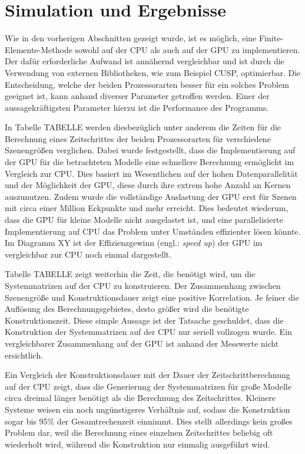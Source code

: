 \documentclass{article}
\begin{document}
  \section{Simulation und Ergebnisse} %
  \label{sec:simulation_und_ergebnisse}

    Wie in den vorherigen Abschnitten gezeigt wurde, ist es möglich, eine Finite-Elemente-Methode sowohl auf der CPU als auch auf der GPU zu implementieren.
    Der dafür erforderliche Aufwand ist annähernd vergleichbar und ist durch die Verwendung von externen Bibliotheken, wie zum Beispiel CUSP, optimierbar.
    Die Entscheidung, welche der beiden Prozessorarten besser für ein solches Problem geeignet ist, kann anhand diverser Parameter getroffen werden.
    Einer der aussagekräftigsten Parameter hierzu ist die Performance des Programms.

    In Tabelle TABELLE werden diesbezüglich unter anderem die Zeiten für die Berechnung eines Zeitschrittes der beiden Prozessorarten für verschiedene Szenengrößen verglichen.
    Dabei wurde festgestellt, dass die Implementierung auf der GPU für die betrachteten Modelle eine schnellere Berechnung ermöglicht im Vergleich zur CPU.
    Dies basiert im Wesentlichen auf der hohen Datenparallelität und der Möglichkeit der GPU, diese durch ihre extrem hohe Anzahl an Kernen auszunutzen.
    Zudem wurde die vollständige Auslastung der GPU erst für Szenen mit circa einer Million Eckpunkte und mehr erreicht.
    Dies bedeutet wiederum, dass die GPU für kleine Modelle nicht ausgelastet ist, und eine parallelisierte Implementierung auf CPU das Problem unter Umständen effizienter lösen könnte.
    Im Diagramm XY ist der Effizienzgewinn (engl.: \textit{speed up}) der GPU im vergleichbar zur CPU noch einmal dargestellt.

    Tabelle TABELLE zeigt weiterhin die Zeit, die benötigt wird, um die Systemmatrizen auf der CPU zu konstruieren.
    Der Zusammenhang zwischen Szenengröße und Konstruktionsdauer zeigt eine positive Korrelation.
    Je feiner die Auflösung des Berechnungsgebietes, desto größer wird die benötigte Konstruktionszeit.
    Diese simple Aussage ist der Tatsache geschuldet, dass die Konstruktion der Systemmatrizen auf der CPU nur seriell vollzogen wurde.
    Ein vergleichbarer Zusammenhang auf der GPU ist anhand der Messwerte nicht ersichtlich.

    Ein Vergleich der Konstruktionsdauer mit der Dauer der Zeitschrittberechnung auf der CPU zeigt, dass die Generierung der Systemmatrizen für große Modelle circa dreimal länger benötigt als die Berechnung des Zeitschrittes.
    Kleinere Systeme weisen ein noch ungünstigeres Verhältnis auf, sodass die Konstruktion sogar bis 95\% der Gesamtrechenzeit einnimmt.
    Dies stellt allerdings kein großes Problem dar, weil die Berechnung eines einzelnen Zeitschrittes beliebig oft wiederholt wird, während die Konstruktion nur einmalig ausgeführt wird.
\end{document}
